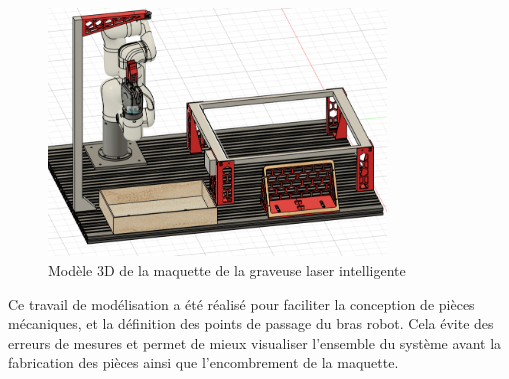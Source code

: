 \begin{figure}[H]
    \centering
    \includegraphics[width=0.8\textwidth]{assets/figures/modele_3d.png}
    \caption{Modèle 3D de la maquette de la graveuse laser intelligente}
    \label{fig:maquette_3d}
\end{figure}

Ce travail de modélisation a été réalisé pour faciliter la conception de pièces mécaniques, et la définition des points de passage du bras robot. Cela évite des erreurs de mesures et permet de mieux visualiser l'ensemble du système avant la fabrication des pièces ainsi que l'encombrement de la maquette.
